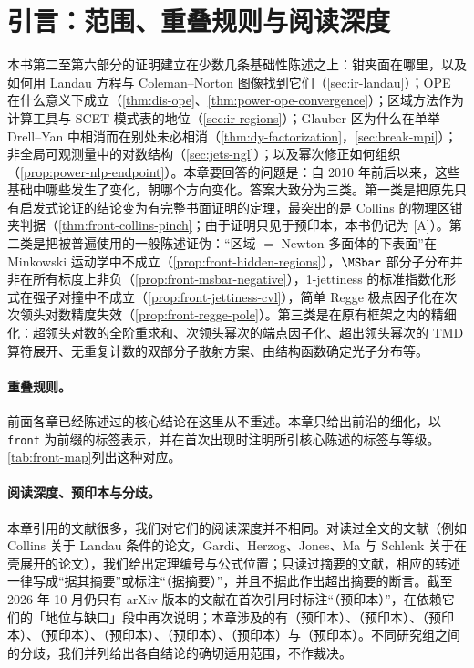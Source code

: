 \section{引言：范围、重叠规则与阅读深度}\label{sec:front-intro}

本书第二至第六部分的证明建立在少数几条基础性陈述之上：钳夹面在哪里，以及如何用 Landau 方程与 Coleman--Norton 图像找到它们（\cref{sec:ir-landau}）；OPE 在什么意义下成立（\cref{thm:dis-ope}、\cref{thm:power-ope-convergence}）；区域方法作为计算工具与 SCET 模式表的地位（\cref{sec:ir-regions}）；Glauber 区为什么在单举 Drell--Yan 中相消而在别处未必相消（\cref{thm:dy-factorization}，\cref{sec:break-mpi}）；非全局可观测量中的对数结构（\cref{sec:jets-ngl}）；以及幂次修正如何组织（\cref{prop:power-nlp-endpoint}）。本章要回答的问题是：自 2010 年前后以来，这些基础中哪些发生了变化，朝哪个方向变化。答案大致分为三类。第一类是把原先只有启发式论证的结论变为有完整书面证明的定理，最突出的是 Collins 的物理区钳夹判据（\cref{thm:front-collins-pinch}；由于证明只见于预印本，本书仍记为 [A]）。第二类是把被普遍使用的一般陈述证伪：“区域 $=$ Newton 多面体的下表面”在 Minkowski 运动学中不成立（\cref{prop:front-hidden-regions}），$\MSbar$ 部分子分布并非在所有标度上非负（\cref{prop:front-msbar-negative}），1-jettiness 的标准指数化形式在强子对撞中不成立（\cref{prop:front-jettiness-cvl}），简单 Regge 极点因子化在次次领头对数精度失效（\cref{prop:front-regge-pole}）。第三类是在原有框架之内的精细化：超领头对数的全阶重求和、次领头幂次的端点因子化、超出领头幂次的 TMD 算符展开、无重复计数的双部分子散射方案、由结构函数确定光子分布等。

\paragraph{重叠规则。}前面各章已经陈述过的核心结论在这里从不重述。本章只给出前沿的细化，以 \texttt{front} 为前缀的标签表示，并在首次出现时注明所引核心陈述的标签与等级。\cref{tab:front-map}列出这种对应。

\paragraph{阅读深度、预印本与分歧。}本章引用的文献很多，我们对它们的阅读深度并不相同。对读过全文的文献（例如 Collins 关于 Landau 条件的论文\cite{Collins:2020euz}，Gardi、Herzog、Jones、Ma 与 Schlenk 关于在壳展开的论文\cite{Gardi:2022khw}），我们给出定理编号与公式位置；只读过摘要的文献，相应的转述一律写成“据其摘要”或标注“（据摘要）”，并且不据此作出超出摘要的断言。截至 2026 年 10 月仍只有 arXiv 版本的文献在首次引用时标注“（预印本）”，在依赖它们的「地位与缺口」段中再次说明；本章涉及的有\cite{Collins:2020euz}（预印本）、\cite{Frob:2016mzv}（预印本）、\cite{Guida:2011np}（预印本）、\cite{Beneke:2026miy}（预印本）、\cite{Gamberg:2022lju}（预印本）、\cite{Bodwin:2025zzi}（预印本）、\cite{Anastasiou:2025cvy,Anastasiou:2026kpm,Anastasiou:2026jta}（预印本）与\cite{Becher:2026zon,Becher:2026iim}（预印本）。不同研究组之间的分歧，我们并列给出各自结论的确切适用范围，不作裁决。

